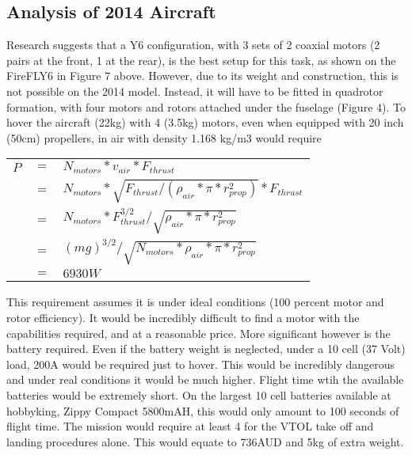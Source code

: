 \label{sec:AppA}

\subsection{Analysis of 2014 Aircraft}
\label{sec:lastYear}
Research suggests that a Y6 configuration, with 3 sets of 2 coaxial motors (2 pairs at the front, 1 at the rear), is the best setup for this task, as shown on the FireFLY6 in Figure 7 above. However, due to its weight and construction, this is not possible on the 2014 model. Instead, it will have to be fitted in quadrotor formation, with four motors and rotors attached under the fuselage (Figure 4). To hover the aircraft (22kg) with 4 (3.5kg) motors, even when equipped with 20 inch (50cm) propellers, in air with density 1.168 kg/m3 would require\\

\begin{tabular}{r c l}
	$P$ & $=$ & $N_{motors}*v_{air}*F_{thrust}$\\
	& $=$ & $N_{motors}*\sqrt{F_{thrust}/(\rho_{air}*\pi*r_{prop}^2)}*F_{thrust}$\\
	& $=$ & $N_{motors}*F_{thrust}^{3/2}/\sqrt{\rho_{air}*\pi*r_{prop}^2}$\\
	& $=$ & $(mg)^{3/2}/\sqrt{N_{motors}*\rho_{air}*\pi*r_{prop}^2}$\\
	& $=$ & $6930W$\\
\end{tabular}
\vspace{6pt}
	
This requirement assumes it is under ideal conditions (100 percent motor and rotor efficiency). It would be incredibly difficult to find a motor with the capabilities required, and at a reasonable price.
More significant however is the battery required. Even if the battery weight is neglected, under a 10 cell (37 Volt) load, 200A would be required just to hover. This would be incredibly dangerous and under real conditions it would be much higher. Flight time wtih the available batteries would be extremely short. On the largest 10 cell batteries available at hobbyking, Zippy Compact 5800mAH, this would only amount to 100 seconds of flight time. The mission would require at least 4 for the VTOL take off and landing procedures alone. This would equate to 736AUD and 5kg of extra weight.

